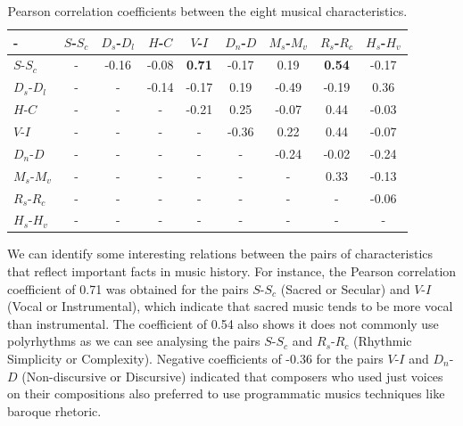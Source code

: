 \documentclass[
 aip,
 jmp,
 amsmath,amssymb,
 reprint,
]{revtex4-1}
\begin{document}
\begin{table}[ht]
\caption{\label{tab:tableB}Pearson correlation coefficients between
  the eight musical characteristics.}

\begin{ruledtabular}
\begin{tabular}{|l||c|c|c|c|c|c|c|c|}

-   & $S$-$S_c$ & $D_s$-$D_l$ & $H$-$C$ & $V$-$I$ & $D_n$-$D$ & $M_s$-$M_v$ & $R_s$-$R_c$ & $H_s$-$H_v$ \\ \hline
$S$-$S_c$ & -     &  -0.16 &  -0.08 &  \textbf{0.71}  & -0.17 &  0.19   &  \textbf{0.54} &  -0.17 \\
$D_s$-$D_l$ & -     &  -     &  -0.14 &  -0.17          &  0.19  &  -0.49  &  -0.19         &  0.36 \\
$H$-$C$ & -     &  -     &  -     &  -0.21          &  0.25  &  -0.07  &  0.44          &  -0.03 \\
$V$-$I$ & -     &  -     &  -     &  -              & -0.36 &  0.22   &  0.44          &  -0.07 \\
$D_n$-$D$ & -     &  -     &  -     &  -              &  -    &  -0.24  &  -0.02          &  -0.24 \\
$M_s$-$M_v$ & -     &  -     &  -     &  -              &  -    &  -      &  0.33          &  -0.13 \\
$R_s$-$R_c$ & -     &  -     &  -     &  -              &  -    &  -      &  -             &  -0.06 \\
$H_s$-$H_v$ & -     &  -     &  -     &  -              &  -    &  -      &  -             &  - \\

\end{tabular}
\end{ruledtabular}
\end{table}

We can identify some interesting relations between the pairs of
characteristics that reflect important facts in music history. For
instance, the Pearson correlation coefficient of 0.71 was obtained for
the pairs $S$-$S_c$ (Sacred or Secular) and $V$-$I$ (Vocal or Instrumental),
which indicate that sacred music tends to be more vocal than
instrumental. The coefficient of 0.54 also shows it does not commonly use polyrhythms as we can see
analysing the pairs $S$-$S_c$ and $R_s$-$R_c$ (Rhythmic Simplicity or Complexity).
Negative coefficients of -0.36 for the pairs $V$-$I$ and $D_n$-$D$
(Non-discursive or Discursive) indicated that composers who used
just voices on their compositions also preferred to use programmatic
musics techniques like baroque rhetoric.
\end{document}
